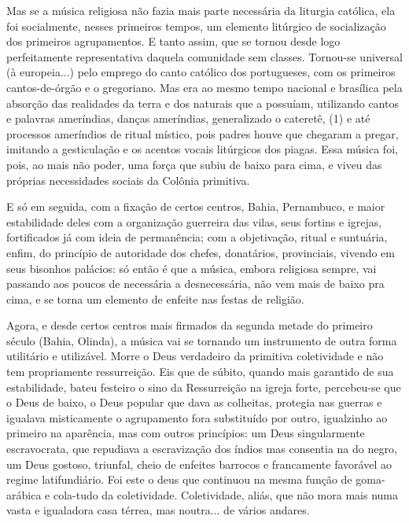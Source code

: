 Mas se a música religiosa não fazia mais parte necessária da liturgia
católica, ela foi socialmente, nesses primeiros tempos, um elemento
litúrgico de socialização dos primeiros agrupamentos. E tanto assim, que
se tornou desde logo perfeitamente representativa daquela comunidade sem
classes. Tornou-se universal (à europeia...) pelo emprego do canto
católico dos portugueses, com os primeiros cantos-de-órgão e o
gregoriano. Mas era ao mesmo tempo nacional e brasílica pela absorção
das realidades da terra e dos naturais que a possuíam, utilizando cantos
e palavras ameríndias, danças ameríndias, generalizado o cateretê, (1) e
até processos ameríndios de ritual místico, pois padres houve que
chegaram a pregar, imitando a gesticulação e os acentos vocais
litúrgicos dos piagas. Essa música foi, pois, ao mais não poder, uma
força que subiu de baixo para cima, e viveu das próprias necessidades
sociais da Colônia primitiva.

E só em seguida, com a fixação de certos centros, Bahia, Pernambuco, e
maior estabilidade deles com a organização guerreira das vilas, seus
fortins e igrejas, fortificados já com ideia de permanência; com a
objetivação, ritual e suntuária, enfim, do princípio de autoridade dos
chefes, donatários, provinciais, vivendo em seus bisonhos palácios: só
então é que a música, embora religiosa sempre, vai passando aos poucos
de necessária a desnecessária, não vem mais de baixo pra cima, e se
torna um elemento de enfeite nas festas de religião.

Agora, e desde certos centros mais firmados da segunda metade do
primeiro século (Bahia, Olinda), a música vai se tornando um instrumento
de outra forma utilitário e utilizável. Morre o Deus verdadeiro da
primitiva coletividade e não tem propriamente ressurreição. Eis que de
súbito, quando mais garantido de sua estabilidade, bateu festeiro o sino
da Ressurreição na igreja forte, percebeu-se que o Deus de baixo, o Deus
popular que dava as colheitas, protegia nas guerras e igualava
misticamente o agrupamento fora substituído por outro, igualzinho ao
primeiro na aparência, mas com outros princípios: um Deus singularmente
escravocrata, que repudiava a escravização dos índios mas consentia na
do negro, um Deus gostoso, triunfal, cheio de enfeites barrocos e
francamente favorável ao regime latifundiário. Foi este o deus que
continuou na mesma função de goma-arábica e cola-tudo da coletividade.
Coletividade, aliás, que não mora mais numa vasta e igualadora casa
térrea, mas noutra... de vários andares.

